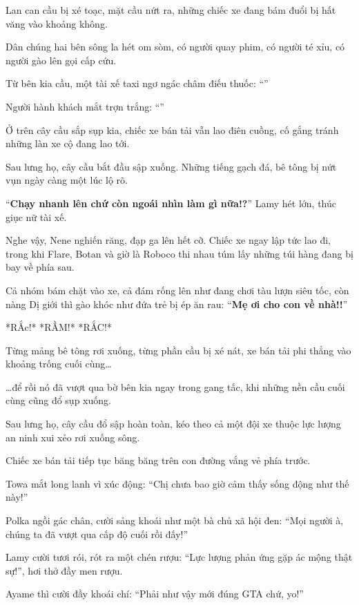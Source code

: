 \documentclass[../main.tex]{subfiles}
\begin{document}
Lan can cầu bị xé toạc, mặt cầu nứt ra, những chiếc xe đang bám đuổi bị hất văng vào khoảng không.

Dân chúng hai bên sông la hét om sòm, có người quay phim, có người té xỉu, có người gào lên gọi cấp cứu.

Từ bên kia cầu, một tài xế taxi ngơ ngác châm điếu thuốc: ``''

Người hành khách mắt trợn trắng: ``''

Ở trên cây cầu sắp sụp kia, chiếc xe bán tải vẫn lao điên cuồng, cố gắng tránh những làn xe cộ đang lao tới.

Sau lưng họ, cây cầu bắt đầu sập xuống. Những tiếng gạch đá, bê tông bị nứt vụn ngày càng một lúc lộ rõ.

``\textbf{Chạy nhanh lên chứ còn ngoái nhìn làm gì nữa!?}'' Lamy hét lớn, thúc giục nữ tài xế.

Nghe vậy, Nene nghiến răng, đạp ga lên hết cỡ. Chiếc xe ngay lập tức lao đi, trong khi Flare, Botan và giờ là Roboco thi nhau túm lấy những túi hàng đang bị bay về phía sau.

Cả nhóm bám chặt vào xe, cả đám rống lên như đang chơi tàu lượn siêu tốc, còn nàng Dị giới thì gào khóc như đứa trẻ bị ép ăn rau: ``\textbf{Mẹ ơi cho con về nhà!!}''

*RẮc!* *RẦM!* *RẮC!*

Từng mảng bê tông rơi xuống, từng phần cầu bị xé nát, xe bán tải phi thẳng vào khoảng trống cuối cùng\dots

\dots để rồi nó đã vượt qua bờ bên kia  ngay trong gang tấc, khi những nền cầu cuối cùng cũng đổ sụp xuống.

Sau lưng họ, cây cầu đổ sập hoàn toàn, kéo theo cả một đội xe thuộc lực lượng an ninh xui xẻo rơi xuống sông.

Chiếc xe bán tải tiếp tục băng băng trên con đường vắng vẻ phía trước.

Towa mắt long lanh vì xúc động: ``Chị chưa bao giờ cảm thấy sống động như thế này!''

Polka ngồi gác chân, cười sảng khoái như một bà chủ xã hội đen: ``Mọi người à, chúng ta đã vượt qua cấp độ cuối rồi đấy!''

Lamy cười tươi rói, rót ra một chén rượu: ``Lực lượng phản ứng gặp ác mộng thật sự!'', hơi thở đầy men rượu.

Ayame thì cười đầy khoái chí: ``Phải như vậy mới đúng GTA chứ, yo!''
\end{document}
